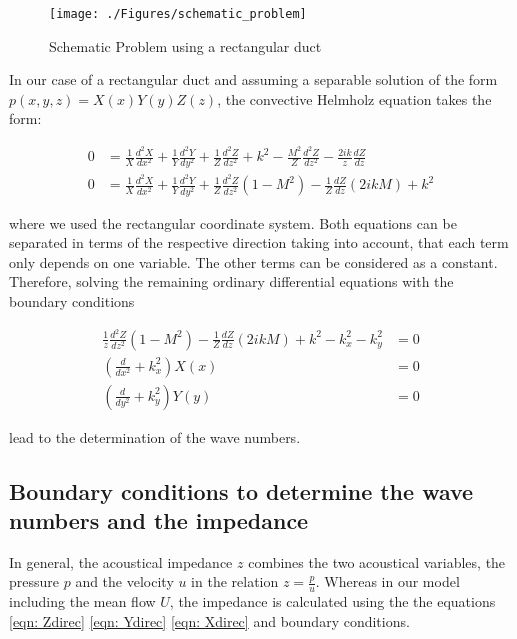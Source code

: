 \documentclass[11pt]{report} %
\begin{document}
\begin{figure}[H]
\centering
\texttt{[image: ./Figures/schematic\_problem]}
\caption{Schematic Problem using a rectangular duct}
\end{figure}

In our case of a rectangular duct and assuming a separable solution of the form  $p(x,y,z) = X(x)Y(y)Z(z)$, the convective Helmholz equation takes the form: 

\begin{subequations}
\begin{align}
0&=\frac{1}{X} \frac{d^2X}{dx^2}+\frac{1}{Y} \frac{d^2Y}{dy^2}+\frac{1}{Z} \frac{d^2Z}{dz^2} +k^2 -\frac{M^2}{Z}\frac{d^2Z}{dz^2}-\frac{2ik}{z} \frac{dZ}{dz}\\
0&=\frac{1}{X} \frac{d^2X}{dx^2}+\frac{1}{Y} \frac{d^2Y}{dy^2}+\frac{1}{Z} \frac{d^2Z}{dz^2}(1-M^2) -\frac{1}{Z}\frac{dZ}{dz}(2ikM)+k^2 	
\end{align}
\end{subequations}

where we used the rectangular coordinate system.
Both equations can be separated in terms of the respective direction taking into account, that each term only depends on one variable. 
The other terms can be considered as a constant. 
Therefore,  solving the remaining ordinary differential equations with the boundary conditions

\begin{subequations}
\begin{align}
\frac{1}{z}\frac{d^2Z}{dz^2}(1-M^2)-\frac{1}{Z}\frac{dZ}{dz}(2ikM)+k^2-k_x^2-k_y^2&=0 \label{eqn: Zdirec} \\
\left( \frac{d}{dx^2}+k_x^2\right)X(x)&=0 \label{eqn: Ydirec} \\
\left( \frac{d}{dy^2}+k_y^2\right)Y(y)&=0 \label{eqn: Xdirec}
\end{align}
\end{subequations} 

lead to the determination of the wave numbers.   

\subsection{Boundary conditions to determine the wave numbers and the impedance}
In general, the acoustical impedance $z$ combines the two acoustical variables, the pressure $p$ and the velocity $u$ in the relation $z=\frac{p}{u}$. 
Whereas in our model including the mean flow $U$, the impedance is calculated using the the equations \ref{eqn: Zdirec} \ref{eqn: Ydirec} \ref{eqn: Xdirec} and boundary conditions. 
\end{document}
